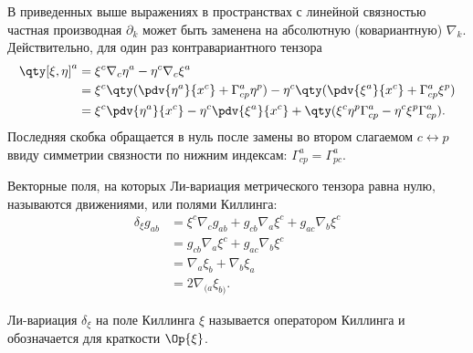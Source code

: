     В приведенных выше выражениях в пространствах с линейной связностью частная производная $\partial_k$ может быть заменена на абсолютную (ковариантную) $\nabla_k$. Действительно, для один раз контравариантного тензора
    \begin{equation}\begin{aligned}
        \qty[\xi, \eta]^a
            &= \xi^c \nabla_c \eta^a - \eta^c \nabla_{c} \xi^a \\
            &= \xi^c \qty( \pdv{\eta^a}{x^c} + \Gamma_{cp}^a \eta^p )
                - \eta^c \qty( \pdv{\xi^a}{x^c} + \Gamma_{cp}^a \xi^p ) \\
            &= \xi^c \pdv{\eta^a}{x^c} - \eta^c \pdv{\xi^a}{x^c}
                + \qty( \xi^c \eta^p \Gamma_{cp}^a - \eta^c \xi^p \Gamma_{cp}^a ) .
    \end{aligned}\end{equation}
    Последняя скобка обращается в нуль после замены во втором слагаемом $c \leftrightarrow p$ ввиду симметрии связности по нижним индексам: $\Gamma_{cp}^a = \Gamma_{pc}^a$.

    Векторные поля, на которых Ли-вариация метрического тензора равна нулю, называются движениями, или полями Киллинга:
    \begin{equation}\begin{aligned}
        \delta_\xi g_{ab}
            &= \xi^c \nabla_c g_{ab} + g_{cb} \nabla_{a} \xi^c + g_{ac} \nabla_{b} \xi^c \\
            &= g_{cb} \nabla_{a} \xi^c + g_{ac} \nabla_{b} \xi^c \\
            &= \nabla_{a} \xi_b + \nabla_{b} \xi_a \\
            &= 2 \nabla_{(a} \xi_{b)}.
    \end{aligned}\end{equation}

    Ли-вариация $\delta_\xi$ на поле Киллинга $\xi$ называется оператором Киллинга и обозначается для краткости $\Op{\xi}$.

